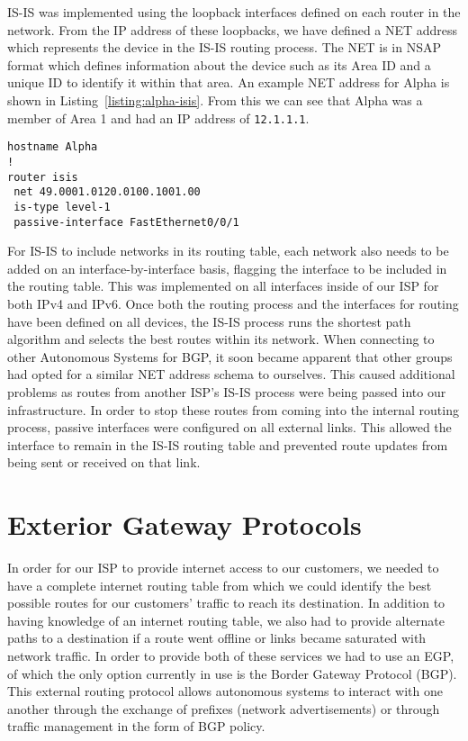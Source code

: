 IS-IS was implemented using the loopback interfaces defined on each router in
the network. From the IP address of these loopbacks, we have defined a NET
address which represents the device in the IS-IS routing process. The NET is in
NSAP format which defines information about the device such as its Area ID and
a unique ID to identify it within that area. An example NET address for Alpha
is shown in Listing~\ref{listing:alpha-isis}. From this we can see that Alpha
was a member of Area 1 and had an IP address of \texttt{12.1.1.1}.

\begin{lstlisting}[caption={Alpha IS-IS Configuration}, label={listing:alpha-isis}]
hostname Alpha
!
router isis
 net 49.0001.0120.0100.1001.00
 is-type level-1
 passive-interface FastEthernet0/0/1
\end{lstlisting}

For IS-IS to include networks in its routing table, each network also needs to be
added on an interface-by-interface basis, flagging the interface to be included
in the routing table. This was implemented on all interfaces inside of our ISP
for both IPv4 and IPv6. Once both the routing process and the interfaces for
routing have been defined on all devices, the IS-IS process runs the shortest
path algorithm and selects the best routes within its network. When connecting
to other Autonomous Systems for BGP, it soon became apparent that other groups
had opted for a similar NET address schema to ourselves. This caused additional
problems as routes from another ISP's IS-IS process were being passed into our
infrastructure. In order to stop these routes from coming into the internal
routing process, passive interfaces were configured on all external links. This
allowed the interface to remain in the IS-IS routing table and prevented route
updates from being sent or received on that link.

\section{Exterior Gateway Protocols}
In order for our ISP to provide internet access to our customers, we needed to have
a complete internet routing table from which we could identify the best
possible routes for our customers' traffic to reach its destination. In
addition to having knowledge of an internet routing table, we also had to
provide alternate paths to a destination if a route went offline or links
became saturated with network traffic. In order to provide both of these
services we had to use an EGP, of which the only option currently in use is the
Border Gateway Protocol (BGP). This external routing protocol allows autonomous
systems to interact with one another through the exchange of prefixes (network
advertisements) or through traffic management in the form of BGP policy.

